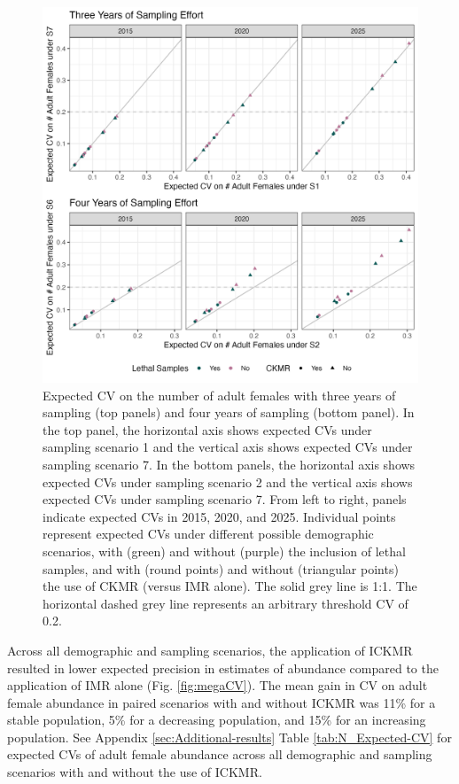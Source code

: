 \begin{figure}
\includegraphics[scale=0.9]{../figures/CVsSameEffort}

\caption{Expected CV on the number of adult females with three years of sampling
(top panels) and four years of sampling (bottom panel). In the top
panel, the horizontal axis shows expected CVs under sampling scenario
1 and the vertical axis shows expected CVs under sampling scenario
7. In the bottom panels, the horizontal axis shows expected CVs under
sampling scenario 2 and the vertical axis shows expected CVs under
sampling scenario 7. From left to right, panels indicate expected
CVs in 2015, 2020, and 2025. Individual points represent expected
CVs under different possible demographic scenarios, with (green) and
without (purple) the inclusion of lethal samples, and with (round
points) and without (triangular points) the use of CKMR (versus IMR
alone). The solid grey line is 1:1. The horizontal dashed grey line
represents an arbitrary threshold CV of 0.2.\label{fig:cvWsameeff}}
\end{figure}

Across all demographic and sampling scenarios, the application of
ICKMR resulted in lower expected precision in estimates of abundance
compared to the application of IMR alone (Fig. \ref{fig:megaCV}).
The mean gain in CV on adult female abundance in paired scenarios
with and without ICKMR was 11\% for a stable population, 5\% for a
decreasing population, and 15\% for an increasing population. See
Appendix \ref{sec:Additional-results} Table \ref{tab:N_Expected-CV}
for expected CVs of adult female abundance across all demographic
and sampling scenarios with and without the use of ICKMR.

